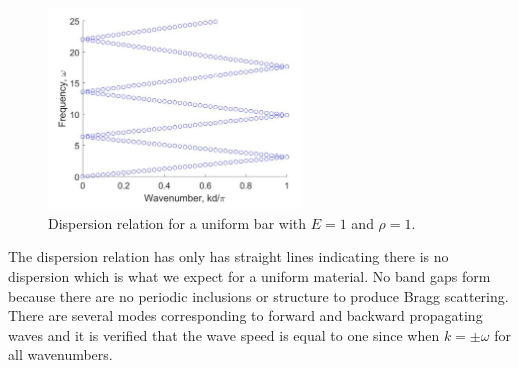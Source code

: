 \documentclass{article}
\begin{document}
\begin{figure}[!htbp]
	\centering
	\includegraphics[width=0.6\textwidth]{unifbar.pdf}
	\caption{Dispersion relation for a uniform bar with $E=1$ and $\rho=1$.}
	\label{fig:unifbar}
\end{figure}
The dispersion relation has only has straight lines indicating there is no 
dispersion which is what we expect for a uniform material. No band gaps form 
because there are no periodic inclusions or structure to produce Bragg 
scattering. There are several modes corresponding to forward and backward 
propagating waves and it is verified that the wave speed is equal to one since 
when $k=\pm \omega$ for all wavenumbers.
\end{document}
